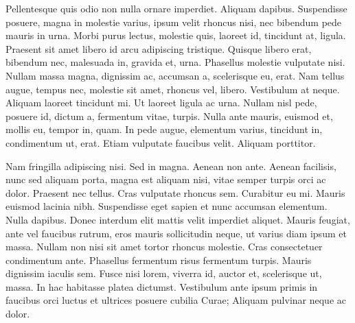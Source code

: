 Pellentesque quis odio non nulla ornare imperdiet. Aliquam dapibus.
Suspendisse posuere, magna in molestie varius, ipsum velit rhoncus nisi,
nec bibendum pede mauris in urna. Morbi purus lectus, molestie quis,
laoreet id, tincidunt at, ligula. Praesent sit amet libero id arcu
adipiscing tristique. Quisque libero erat, bibendum nec, malesuada in,
gravida et, urna. Phasellus molestie vulputate nisi. Nullam massa magna,
dignissim ac, accumsan a, scelerisque eu, erat. Nam tellus augue, tempus
nec, molestie sit amet, rhoncus vel, libero. Vestibulum at neque.
Aliquam laoreet tincidunt mi. Ut laoreet ligula ac urna. Nullam nisl
pede, posuere id, dictum a, fermentum vitae, turpis. Nulla ante mauris,
euismod et, mollis eu, tempor in, quam. In pede augue, elementum varius,
tincidunt in, condimentum ut, erat. Etiam vulputate faucibus velit.
Aliquam porttitor.

Nam fringilla adipiscing nisi. Sed in magna. Aenean non ante. Aenean
facilisis, nunc sed aliquam porta, magna est aliquam nisi, vitae semper
turpis orci ac dolor. Praesent nec tellus. Cras vulputate rhoncus sem.
Curabitur eu mi. Mauris euismod lacinia nibh. Suspendisse eget sapien et
nunc accumsan elementum. Nulla dapibus. Donec interdum elit mattis velit
imperdiet aliquet. Mauris feugiat, ante vel faucibus rutrum, eros mauris
sollicitudin neque, ut varius diam ipsum et massa. Nullam non nisi sit
amet tortor rhoncus molestie. Cras consectetuer condimentum ante.
Phasellus fermentum risus fermentum turpis. Mauris dignissim iaculis
sem. Fusce nisi lorem, viverra id, auctor et, scelerisque ut, massa. In
hac habitasse platea dictumst. Vestibulum ante ipsum primis in faucibus
orci luctus et ultrices posuere cubilia Curae; Aliquam pulvinar neque ac
dolor.
